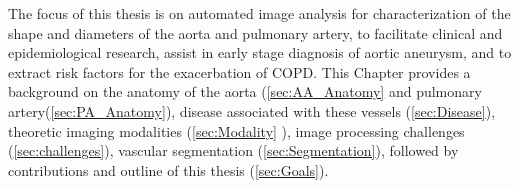 The focus of this thesis is on automated image analysis for characterization of the shape and diameters of the aorta and pulmonary artery, to facilitate clinical and epidemiological research, assist in early stage diagnosis of aortic aneurysm, and to extract risk factors for the exacerbation of COPD. This Chapter provides a background on the anatomy of the aorta (\cref{sec:AA_Anatomy} and pulmonary artery(\cref{sec:PA_Anatomy}), disease associated with these vessels (\cref{sec:Disease}), theoretic imaging modalities (\cref{sec:Modality} ), image processing challenges (\cref{sec:challenges}),  vascular segmentation (\cref{sec:Segmentation}), followed by contributions and outline of this thesis (\cref{sec:Goals}).
%
%


